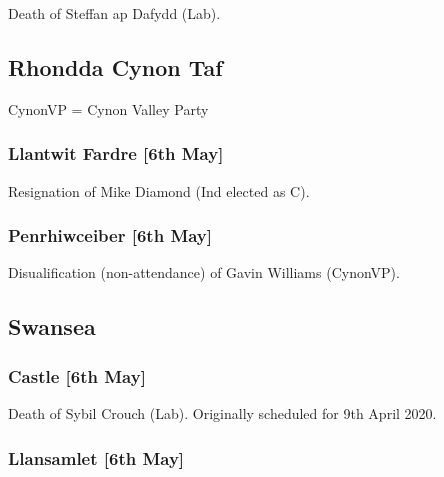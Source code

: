 \documentclass[a4paper,openany]{book}
\begin{document}
\begin{resultsiii}
Death of Steffan ap Dafydd (Lab).

\subsection*{Rhondda Cynon Taf}

CynonVP = Cynon Valley Party

\subsubsection*{Llantwit Fardre \hspace*{\fill}\nolinebreak[1]%
	\enspace\hspace*{\fill}
	[6th May]}


Resignation of Mike Diamond (Ind elected as C).

\subsubsection*{Penrhiwceiber \hspace*{\fill}\nolinebreak[1]%
	\enspace\hspace*{\fill}
	[6th May]}


Disualification (non-attendance) of Gavin Williams (CynonVP).

\subsection*{Swansea}

\subsubsection*{Castle \hspace*{\fill}\nolinebreak[1]%
	\enspace\hspace*{\fill}
	[6th May]}


Death of Sybil Crouch (Lab).  Originally scheduled for 9th April 2020.

\subsubsection*{Llansamlet \hspace*{\fill}\nolinebreak[1]%
	\enspace\hspace*{\fill}
	[6th May]}


\end{resultsiii}
\end{document}
